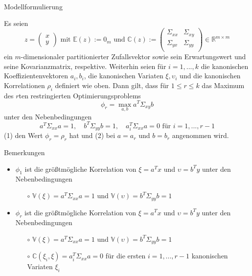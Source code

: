 \documentclass[
  8pt,
  ignorenonframetext,
]{beamer}
\begin{document}
\begin{frame}{Modellformulierung}
\protect\hypertarget{modellformulierung-4}{}
\footnotesize
\begin{theorem}
\normalfont
\justifying
Es seien
\begin{equation}
z = \begin{pmatrix} x \\ y \end{pmatrix}
\mbox{ mit }
\mathbb{E}(z) := 0_m
\mbox{ und }
\mathbb{C}(z) :=
\begin{pmatrix}
\Sigma_{xx} & \Sigma_{xy} \\
\Sigma_{yx} & \Sigma_{yy} \\
\end{pmatrix}
\in \mathbb{R}^{m \times m}
\end{equation}
ein $m$-dimensionaler partitionierter Zufallsvektor sowie sein Erwartungswert
und seine Kovarianzmatrix, respektive. Weiterhin seien für $i = 1,...,k$ die kanonischen Koeffizientenvektoren $a_i, b_i$,
die kanonischen Variaten $\xi,\upsilon_i$ und die kanonischen Korrelationen $\rho_i$
definiert wie oben. Dann gilt, dass für $1 \le r \le k$ das Maximum des $r$ten
restringierten Optimierungsproblems
\begin{equation}
\phi_r = \max_{a,b} a^T\Sigma_{xy}b
\end{equation}
unter den Nebenbedingungen
\begin{equation}
a^T\Sigma_{xx}a   = 1,
\quad
b^T\Sigma_{yy}b   = 1,
\quad
a_i^T\Sigma_{xx}a = 0 \mbox{ für } i = 1,...,r-1
\end{equation}
(1) den Wert $\phi_r = \rho_r$ hat und (2) bei $a = a_r$ und $b = b_r$ angenommen wird.
\end{theorem}
\vspace{-1mm}

Bemerkungen \vspace{-2mm}

\begin{itemize}
\item $\phi_1$ ist die größtmögliche Korrelation von $\xi = a^Tx$ und $\upsilon = b^Ty$ unter den Nebenbedingungen
\begin{itemize}
\footnotesize
\item[$\circ$] $\mathbb{V}(\xi) =  a^T\Sigma_{xx}a = 1$ und $\mathbb{V}(\upsilon) = b^T\Sigma_{yy}b = 1$
\end{itemize}
\item $\phi_r$ ist die größtmögliche Korrelation von $\xi = a^Tx$ und $\upsilon = b^Ty$  unter den Nebenbedingungen
\begin{itemize}
\footnotesize
\item[$\circ$] $\mathbb{V}(\xi) = a^T\Sigma_{xx}a = 1$ und $\mathbb{V}(\upsilon) = b^T\Sigma_{yy}b = 1$
\item[$\circ$]  $\mathbb{C}(\xi_i,\xi) = a_i^T\Sigma_{xx}a = 0$  für die ersten $i = 1,...,r-1$ kanonischen Variaten $\xi_i$
\end{itemize}
\end{itemize}
\end{frame}
\end{document}
